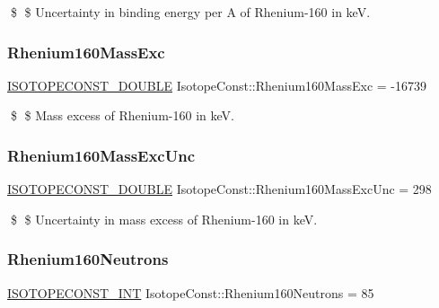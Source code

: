 \$ \$ Uncertainty in binding energy per A of Rhenium-\/160 in keV. \mbox{\label{group___isotope_const-_rhenium-_re160_ga0e3e475e677a7f6962f475a8bf250313}} 
\subsubsection{\texorpdfstring{Rhenium160\+Mass\+Exc}{Rhenium160MassExc}}
{\footnotesize\ttfamily \mbox{\hyperlink{group___isotope_const-_macros_ga8f45a7272ce02c0b4c65c44636ed719a}{I\+S\+O\+T\+O\+P\+E\+C\+O\+N\+S\+T\+\_\+\+D\+O\+U\+B\+LE}} Isotope\+Const\+::\+Rhenium160\+Mass\+Exc = -\/16739}

\$ \$ Mass excess of Rhenium-\/160 in keV. \mbox{\label{group___isotope_const-_rhenium-_re160_ga3a0445a22507b42f0c0b0ce4466c65cf}} 
\subsubsection{\texorpdfstring{Rhenium160\+Mass\+Exc\+Unc}{Rhenium160MassExcUnc}}
{\footnotesize\ttfamily \mbox{\hyperlink{group___isotope_const-_macros_ga8f45a7272ce02c0b4c65c44636ed719a}{I\+S\+O\+T\+O\+P\+E\+C\+O\+N\+S\+T\+\_\+\+D\+O\+U\+B\+LE}} Isotope\+Const\+::\+Rhenium160\+Mass\+Exc\+Unc = 298}

\$ \$ Uncertainty in mass excess of Rhenium-\/160 in keV. \mbox{\label{group___isotope_const-_rhenium-_re160_gace01ab5ff5d1e5f2621853a30c6e7a49}} 
\subsubsection{\texorpdfstring{Rhenium160\+Neutrons}{Rhenium160Neutrons}}
{\footnotesize\ttfamily \mbox{\hyperlink{group___isotope_const-_macros_ga5f18360b3e99483a35c32d789e62621c}{I\+S\+O\+T\+O\+P\+E\+C\+O\+N\+S\+T\+\_\+\+I\+NT}} Isotope\+Const\+::\+Rhenium160\+Neutrons = 85}

